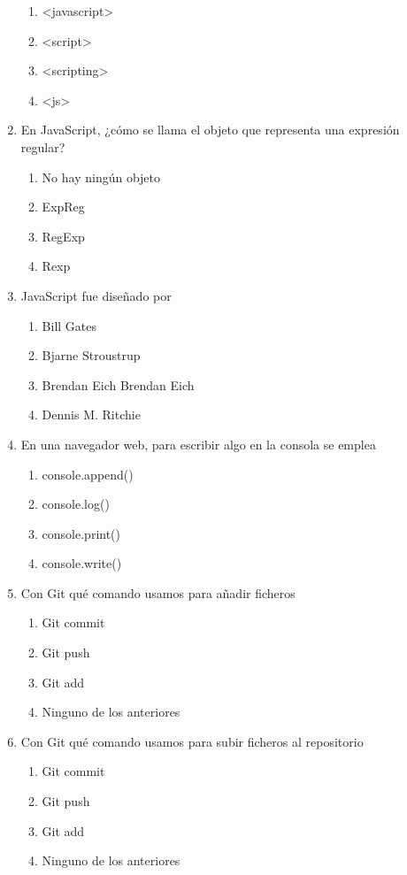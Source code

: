 \documentclass[addpoints, 12]{exam}
\begin{document}
\begin{enumerate}
\begin{enumerate}
\item <javascript>
\item <script>
\item <scripting>
\item <js>
\end{enumerate}

\item En JavaScript, ¿cómo se llama el objeto que representa una expresión regular?

\begin{enumerate}
\item No hay ningún objeto
\item ExpReg
\item RegExp
\item Rexp
\end{enumerate}

\item JavaScript fue diseñado por

\begin{enumerate}
\item Bill Gates
\item Bjarne Stroustrup
\item Brendan Eich  Brendan Eich
\item Dennis M. Ritchie
\end{enumerate}

\item En una navegador web, para escribir algo en la consola se emplea

\begin{enumerate}
\item console.append()
\item console.log()
\item console.print()
\item console.write()
\end{enumerate}

\item Con Git qué comando usamos para añadir ficheros

\begin{enumerate}
\item Git commit
\item Git push
\item Git add
\item Ninguno de los anteriores
\end{enumerate}

\item Con Git qué comando usamos para subir ficheros al repositorio

\begin{enumerate}
\item Git commit
\item Git push
\item Git add
\item Ninguno de los anteriores
\end{enumerate}
\end{enumerate}
\end{document}
